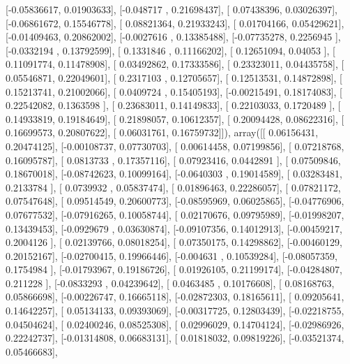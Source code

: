 \documentclass{article}
\begin{document}
       [-0.05836617,  0.01903633],
       [-0.048717  ,  0.21698437],
       [ 0.07438396,  0.03026397],
       [-0.06861672,  0.15546778],
       [ 0.08821364,  0.21933243],
       [ 0.01704166,  0.05429621],
       [-0.01409463,  0.20862002],
       [-0.0027616 ,  0.13385488],
       [-0.07735278,  0.2256945 ],
       [-0.0332194 ,  0.13792599],
       [ 0.1331846 ,  0.11166202],
       [ 0.12651094,  0.04053   ],
       [ 0.11091774,  0.11478908],
       [ 0.03492862,  0.17333586],
       [ 0.23323011,  0.04435758],
       [ 0.05546871,  0.22049601],
       [ 0.2317103 ,  0.12705657],
       [ 0.12513531,  0.14872898],
       [ 0.15213741,  0.21002066],
       [ 0.0409724 ,  0.15405193],
       [-0.00215491,  0.18174083],
       [ 0.22542082,  0.1363598 ],
       [ 0.23683011,  0.14149833],
       [ 0.22103033,  0.1720489 ],
       [ 0.14933819,  0.19184649],
       [ 0.21898057,  0.10612357],
       [ 0.20094428,  0.08622316],
       [ 0.16699573,  0.20807622],
       [ 0.06031761,  0.16759732]]), array([[ 0.06156431,  0.20474125],
       [-0.00108737,  0.07730703],
       [ 0.00614458,  0.07199856],
       [ 0.07218768,  0.16095787],
       [ 0.0813733 ,  0.17357116],
       [ 0.07923416,  0.0442891 ],
       [ 0.07509846,  0.18670018],
       [-0.08742623,  0.10099164],
       [-0.0640303 ,  0.19014589],
       [ 0.03283481,  0.2133784 ],
       [ 0.0739932 ,  0.05837474],
       [ 0.01896463,  0.22286057],
       [ 0.07821172,  0.07547648],
       [ 0.09514549,  0.20600773],
       [-0.08595969,  0.06025865],
       [-0.04776906,  0.07677532],
       [-0.07916265,  0.10058744],
       [ 0.02170676,  0.09795989],
       [-0.01998207,  0.13439453],
       [-0.0929679 ,  0.03630874],
       [-0.09107356,  0.14012913],
       [-0.00459217,  0.2004126 ],
       [ 0.02139766,  0.08018254],
       [ 0.07350175,  0.14298862],
       [-0.00460129,  0.20152167],
       [-0.02700415,  0.19966446],
       [-0.004631  ,  0.10539284],
       [-0.08057359,  0.1754984 ],
       [-0.01793967,  0.19186726],
       [ 0.01926105,  0.21199174],
       [-0.04284807,  0.211228  ],
       [-0.0833293 ,  0.04239642],
       [ 0.0463485 ,  0.10176608],
       [ 0.08168763,  0.05866698],
       [-0.00226747,  0.16665118],
       [-0.02872303,  0.18165611],
       [ 0.09205641,  0.14642257],
       [ 0.05134133,  0.09393069],
       [-0.00317725,  0.12803439],
       [-0.02218755,  0.04504624],
       [ 0.02400246,  0.08525308],
       [ 0.02996029,  0.14704124],
       [-0.02986926,  0.22242737],
       [-0.01314808,  0.06683131],
       [ 0.01818032,  0.09819226],
       [-0.03521374,  0.05466683],
\end{document}
